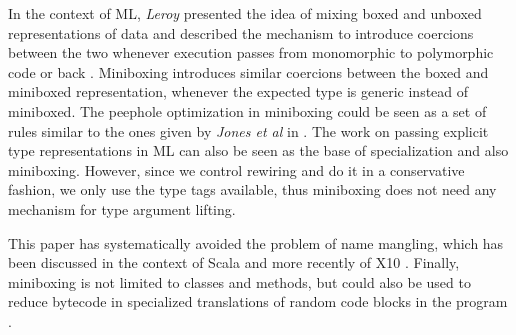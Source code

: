 In the context of ML, {\em Leroy} presented the idea of mixing boxed and unboxed representations of data and described the mechanism to introduce coercions between the two whenever execution passes from monomorphic to polymorphic code or back \cite{leroy-unboxed-objects}. Miniboxing introduces similar coercions between the boxed and miniboxed representation, whenever the expected type is generic instead of miniboxed. The peephole optimization in miniboxing could be seen as a set of rules similar to the ones given by {\em Jones et al} in \cite{spj-unboxed-values}. The work on passing explicit type representations in ML \cite{harper-intensional-type-analysis, tolmach-tag-free-gc, tarditi-til, minamide-full-lifting} can also be seen as the base of specialization and also miniboxing. However, since we control rewiring and do it in a conservative fashion, we only use the type tags available, thus miniboxing does not need any mechanism for type argument lifting.

This paper has systematically avoided the problem of name mangling, which has been discussed in the context of Scala \cite{iuli-thesis} and more recently of X10 \cite{x10-fast-dispatch}. Finally, miniboxing is not limited to classes and methods, but could also be used to reduce bytecode in specialized translations of random code blocks in the program \cite{bridging}.
